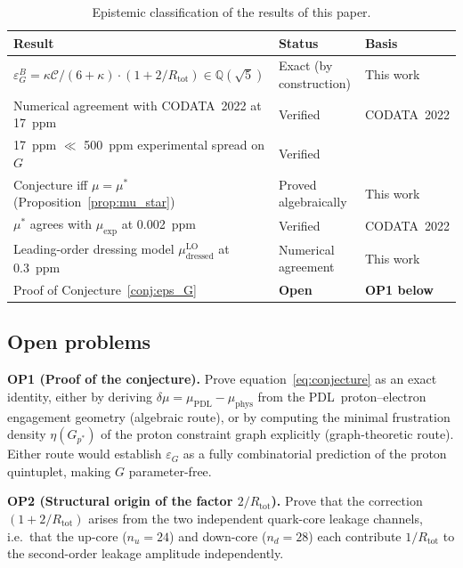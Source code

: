 \documentclass[11pt,a4paper]{article}
\theoremstyle{definition}
\newcommand{\PDL}{\textnormal{PDL}}
\newcommand{\Rtot}{R_{\mathrm{tot}}}
\newcommand{\epsg}{\varepsilon_G}
\newcommand{\calC}{\mathcal{C}}
\newcommand{\kap}{\kappa}
\newcommand{\muPDL}{\mu_{\mathrm{PDL}}}
\newcommand{\muexp}{\mu_{\mathrm{exp}}}
\newcommand{\mustar}{\mu^*}
\newcommand{\muphys}{\mu_{\mathrm{phys}}}
\begin{document}
\begin{table}[ht]
\centering
\caption{Epistemic classification of the results of this paper.}
\label{tab:epistemic}
\bigskip
\begin{tabular}{p{7cm}p{3cm}p{4cm}}
\toprule
Result & Status & Basis \\
\midrule
$\epsg^B = \kap\calC/(6+\kap)\cdot(1+2/\Rtot) \in \mathbb{Q}(\sqrt{5})$ & Exact (by construction) & This work \\
Numerical agreement with CODATA~2022 at 17~ppm & Verified & CODATA~2022 \cite{CODATA_2022} \\
17~ppm $\ll$ 500~ppm experimental spread on $G$ & Verified & \cite{Quinn_2013,Rosi_2014,Li_2018,NIST_2024} \\
Conjecture iff $\mu = \mustar$ (Proposition~\ref{prop:mu_star}) & Proved algebraically & This work \\
$\mustar$ agrees with $\muexp$ at 0.002~ppm & Verified & CODATA~2022 \cite{CODATA_2022} \\
Leading-order dressing model $\mu_{\mathrm{dressed}}^{\mathrm{LO}}$ at 0.3~ppm & Numerical agreement & This work \\
Proof of Conjecture~\ref{conj:eps_G} & \textbf{Open} & \textbf{OP1 below} \\
\bottomrule
\end{tabular}
\end{table}

\subsection{Open problems}
\label{subsec:problems}

\medskip\noindent\textbf{OP1 (Proof of the conjecture).} Prove equation~\eqref{eq:conjecture} as an exact identity, either by deriving $\delta\mu = \muPDL - \muphys$ from the \PDL\ proton--electron engagement geometry (algebraic route), or by computing the minimal frustration density $\eta(G_{p^*})$ of the proton constraint graph explicitly (graph-theoretic route). Either route would establish $\epsg$ as a fully combinatorial prediction of the proton quintuplet, making $G$ parameter-free.

\medskip\noindent\textbf{OP2 (Structural origin of the factor $2/\Rtot$).} Prove that the correction $(1+2/\Rtot)$ arises from the two independent quark-core leakage channels, i.e.\ that the up-core ($n_u = 24$) and down-core ($n_d = 28$) each contribute $1/\Rtot$ to the second-order leakage amplitude independently.
\end{document}
